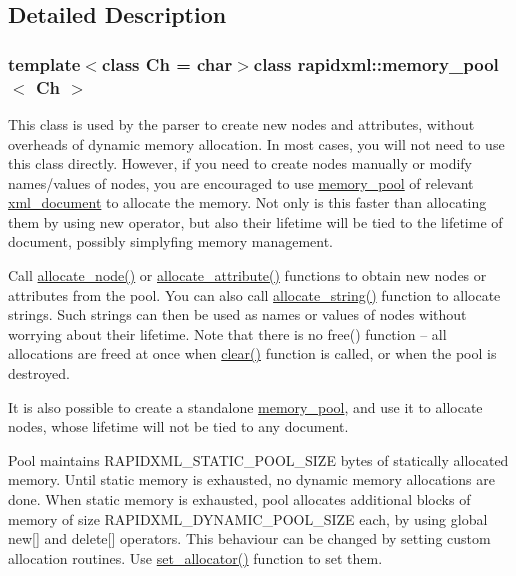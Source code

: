 \subsection{Detailed Description}
\subsubsection*{template$<$class Ch = char$>$class rapidxml\-::memory\-\_\-pool$<$ Ch $>$}

This class is used by the parser to create new nodes and attributes, without overheads of dynamic memory allocation. In most cases, you will not need to use this class directly. However, if you need to create nodes manually or modify names/values of nodes, you are encouraged to use \hyperlink{classrapidxml_1_1memory__pool}{memory\-\_\-pool} of relevant \hyperlink{classrapidxml_1_1xml__document}{xml\-\_\-document} to allocate the memory. Not only is this faster than allocating them by using {\ttfamily new} operator, but also their lifetime will be tied to the lifetime of document, possibly simplyfing memory management. \par
\par
 Call \hyperlink{classrapidxml_1_1memory__pool_a4118581c29ee9a2f6b55ebf7dac185f8}{allocate\-\_\-node()} or \hyperlink{classrapidxml_1_1memory__pool_a3de2a66c983336e006ea3844e244ed30}{allocate\-\_\-attribute()} functions to obtain new nodes or attributes from the pool. You can also call \hyperlink{classrapidxml_1_1memory__pool_a171941b39d55b868358da97462185f58}{allocate\-\_\-string()} function to allocate strings. Such strings can then be used as names or values of nodes without worrying about their lifetime. Note that there is no {\ttfamily free()} function -- all allocations are freed at once when \hyperlink{classrapidxml_1_1memory__pool_aad377c835fdaed1cb2cc9df194cf84e4}{clear()} function is called, or when the pool is destroyed. \par
\par
 It is also possible to create a standalone \hyperlink{classrapidxml_1_1memory__pool}{memory\-\_\-pool}, and use it to allocate nodes, whose lifetime will not be tied to any document. \par
\par
 Pool maintains {\ttfamily R\-A\-P\-I\-D\-X\-M\-L\-\_\-\-S\-T\-A\-T\-I\-C\-\_\-\-P\-O\-O\-L\-\_\-\-S\-I\-Z\-E} bytes of statically allocated memory. Until static memory is exhausted, no dynamic memory allocations are done. When static memory is exhausted, pool allocates additional blocks of memory of size {\ttfamily R\-A\-P\-I\-D\-X\-M\-L\-\_\-\-D\-Y\-N\-A\-M\-I\-C\-\_\-\-P\-O\-O\-L\-\_\-\-S\-I\-Z\-E} each, by using global {\ttfamily new\mbox{[}\mbox{]}} and {\ttfamily delete\mbox{[}\mbox{]}} operators. This behaviour can be changed by setting custom allocation routines. Use \hyperlink{classrapidxml_1_1memory__pool_a84d3d8d2cdfc00501e1dcf26d889ae03}{set\-\_\-allocator()} function to set them. \par
